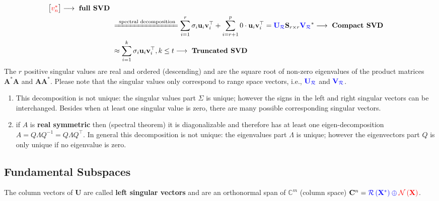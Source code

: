 \documentclass[14pt]{article}
\theoremstyle{definition}
\theoremstyle{remark}
\newenvironment{remark}
  {\pushQED{\qed}\renewcommand{\qedsymbol}{$\triangle$}\remarkx}
  {\popQED\endremarkx}
\begin{document}
\begin{align*}
\begin{bmatrix}
        \color{red}{v_{n}^{*}}
    \end{bmatrix} \longrightarrow \text{ \textbf{full SVD} }                                                                                               \\
     & \xlongequal{\text{ spectral decomposition}}\sum_{i=1}^{r} \sigma_{i} \mathbf{u}_{i} \mathbf{v}_{i}^\top
    + \sum_{i=r+1}^{p} 0\cdot \mathbf{u}_{i} \mathbf{v}_{i}^\top
    = {\color{blue}\mathbf{U}_{\mathcal{R}}}\mathbf{S}_{r\times r}{\color{blue}\mathbf{V}_{\mathcal{R}}}^{*} \longrightarrow \text{ \textbf{Compact SVD} } \\
     & \approx \sum_{i=1}^{k} \sigma_{i} \mathbf{u}_{i} \mathbf{v}_{i}^\top, k\le t \longrightarrow \text{ \textbf{Truncated SVD} }
\end{align*}
The $r$ positive singular values are real and ordered (descending) and are the square root of non-zero
eigenvalues of the product matrices $\mathbf{A}^* \mathbf{A}$ and $\mathbf{A} \mathbf{A}^*$. Please note that the singular values only correspond to range space vectors, i.e., $\color{blue}{\mathbf{U}_{\mathcal{R}}}$ and $\color{blue}{\mathbf{V}_{\mathcal{R}}}$.

\begin{remark}\hfill
    \begin{enumerate}
        \item This decomposition is not unique:
              the singular values part $\Sigma$ is unique;
              however the signs in the left and right singular vectors can be interchanged.
              Besides when at least one singular value is zero, there are many possible
              corresponding singular vectors.
        \item if $A$ is \textbf{real symmetric} then (spectral theorem) it is diagonalizable and therefore
              has at least one eigen-decomposition $A=Q \Lambda Q^{-1}=Q \Lambda Q^{\top}$.
              In general this decomposition is not unique: the eigenvalues part $\Lambda$ is unique;
              however the eigenvectors part $Q$ is only unique if no eigenvalue is zero.
    \end{enumerate}
\end{remark}
\subsection*{Fundamental Subspaces}
The column vectors of $\mathbf{U}$ are called \textbf{left singular vectors} and are an orthonormal span of
$\mathbb{C}^m$ (column space) $\mathbf{C}^{n} =
    \color{blue}{\mathcal{R} \left( \mathbf{X}^{*} \right)} \oplus
    \color{red}{\mathcal{N} \left( \mathbf{X} \right)}$.
\end{document}
